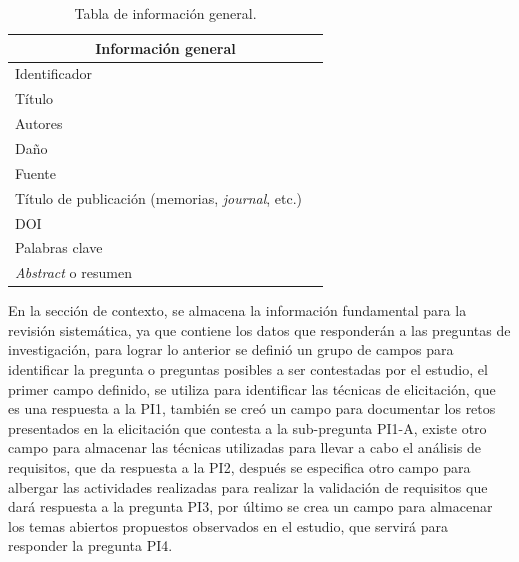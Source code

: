 \documentclass{article}
\begin{document}
\begin{table}[h!]
    \begin{center}
    \caption{Tabla de información general.}
    \label{tab:datosgenerales}
    \begin{tabular}{|l|c|} 
    \hline
    \multicolumn{2}{|c|}{Información general} \\
    \hline
    Identificador &       \\
    \hline
    Título & \\
    \hline
    Autores &\\
    \hline
    Daño & \\
    \hline
    Fuente & \\
    \hline
    Título de publicación (memorias, \emph{journal}, etc.) & \\
    \hline
    DOI & \\
    \hline
    Palabras clave & \\
    \hline
    \emph{Abstract} o resumen & \\
    \hline
    \end{tabular}
    \end{center}
\end{table}

En la sección de contexto, se almacena la información fundamental para la revisión sistemática, ya que contiene los datos que responderán a las
preguntas de investigación, para lograr lo anterior se definió un grupo de campos para identificar la pregunta o preguntas posibles a ser contestadas 
por el estudio, el primer campo definido, se utiliza para identificar las técnicas de elicitación, que es una respuesta a la PI1, también se creó un campo para 
documentar los retos presentados en la elicitación que contesta a la sub-pregunta PI1-A, existe otro campo para almacenar las técnicas utilizadas para llevar a cabo 
el análisis de requisitos, que da respuesta a la PI2, después se especifica otro campo para albergar las actividades realizadas para realizar la validación de requisitos que 
dará respuesta a la pregunta PI3, por último se crea un campo para almacenar los temas abiertos propuestos observados en el estudio, que servirá para responder la pregunta PI4.
\end{document}
